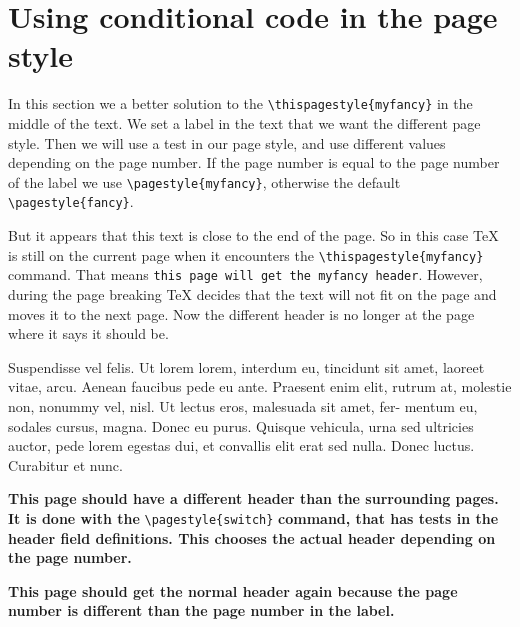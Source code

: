 \documentclass[openany]{book}
\begin{document}
\lipsum[3-5]

\newpage

\section{Using conditional code in the page style}

In this section we a better solution to the \verb|\thispagestyle{myfancy}| in the middle of the text. We set a label in the text that we want the different page style. Then we will use a test in our page style, and use different values depending on the page number. If the page number is equal to the page number of the label we use  \verb|\pagestyle{myfancy}|, otherwise the default  \verb|\pagestyle{fancy}|.

But it appears that this text is close to the end of the page. So in this case \TeX{} is still on the current page when it encounters the \verb|\thispagestyle{myfancy}| command. That means \texttt{this page will get the myfancy header}. However, during the page breaking \TeX{} decides that the text will not fit on the page and moves it to the next page. Now the different header is no longer at the page where it says it should be.

\bigskip

\lipsum[6-8]

\bigskip
Suspendisse vel felis. Ut lorem lorem, interdum eu, tincidunt sit amet, laoreet vitae, arcu. Aenean faucibus pede eu ante. Praesent enim elit, rutrum at, molestie non, nonummy vel, nisl. Ut lectus eros, malesuada sit amet, fer- mentum eu, sodales cursus, magna. Donec eu purus. Quisque vehicula, urna sed ultricies auctor, pede lorem egestas dui, et convallis elit erat sed nulla. Donec luctus. Curabitur et nunc. 

\pagestyle{switch}
\noindent
\begin{minipage}{\linewidth}
  \textbf{This page should have a different header than the surrounding
    pages.
    \label{otherpagestyle}
    It is done with the} \verb|\pagestyle{switch}| \textbf{command, that
    has tests in the header field definitions. This chooses the actual
    header depending on the page number.}
\end{minipage}
\nopagebreak
\addtolength{\headheight}{12.0pt}%
\addtolength{\topmargin}{-12.0pt}%
\bigskip

\lipsum[8-9]

\newpage
\addtolength{\headheight}{-12.0pt}%
\addtolength{\topmargin}{12.0pt}%

\textbf{This page should get the normal header again because the page number is different than the page number in the label.}
 
\bigskip

\lipsum[10]
\end{document}

